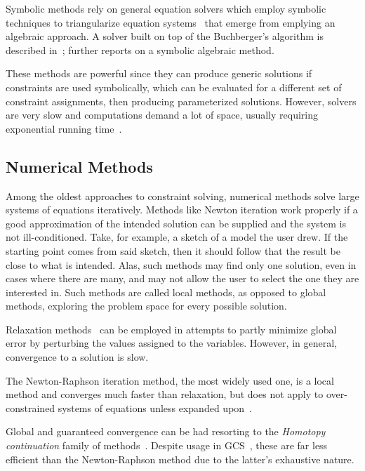 Symbolic methods rely on general equation solvers which employ symbolic
techniques to triangularize equation
systems~\cite{Buchberger:1995:Grobner,Chou:1988:IWMMTPG} that emerge from
emplying an algebraic approach.  A solver built on top of the Buchberger's
algorithm is described in~\cite{Buchanan:1993:CDS}; 
further reports on a symbolic algebraic method.

These methods are powerful since they can produce generic solutions if
constraints are used symbolically, which can be evaluated for a different set of
constraint assignments, then producing parameterized solutions.  However,
solvers are very slow and computations demand a lot of space, usually requiring
exponential running time~\cite{Durand:1998:SNTCS}.

\subsection{Numerical Methods}%
\label{sec:intro.constraints.numerical}

Among the oldest approaches to constraint solving, numerical methods solve large
systems of equations iteratively.  Methods like Newton iteration work properly
if a good approximation of the intended solution can be supplied and the system
is not ill-conditioned.  Take, for example, a sketch of a model the user drew.
If the starting point comes from said sketch, then it should follow that the
result be close to what is intended.  Alas, such methods may find only one
solution, even in cases where there are many, and may not allow the user to
select the one they are interested in.  Such methods are called local methods,
as opposed to global methods, exploring the problem space for every possible
solution.

Relaxation
methods~\cite{Sutherland:1964:Sketchpad,Hillyard:1978:CNSTDT,Borning:1989:PLATL}
can be employed in attempts to partly minimize global error by perturbing the
values assigned to the variables.  However, in general, convergence to a
solution is slow.

The Newton-Raphson iteration method, the most widely used one, is a local method
and converges much faster than relaxation, but does not apply to
over-constrained systems of equations unless expanded
upon~\cite{Dedieu:2000:Newton}.

Global and guaranteed convergence can be had resorting to the \textit{Homotopy
continuation} family of methods~\cite{Allgower:1993:CPF}.  Despite usage in
\ac{GCS}~\cite{Lamure:1996:SGCH,Durand:1998:SNTCS}, these are far less efficient
than the Newton-Raphson method due to the latter's exhaustive nature.

